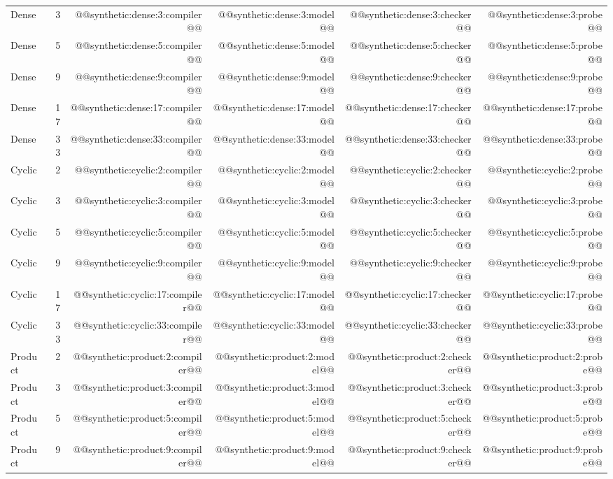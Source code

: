 \begin{longtable}{@{}lrrrrr@{}}
Dense & 3 & @@synthetic:dense:3:compiler@@ & @@synthetic:dense:3:model@@ & @@synthetic:dense:3:checker@@ & @@synthetic:dense:3:probe@@ \\
Dense & 5 & @@synthetic:dense:5:compiler@@ & @@synthetic:dense:5:model@@ & @@synthetic:dense:5:checker@@ & @@synthetic:dense:5:probe@@ \\
Dense & 9 & @@synthetic:dense:9:compiler@@ & @@synthetic:dense:9:model@@ & @@synthetic:dense:9:checker@@ & @@synthetic:dense:9:probe@@ \\
Dense & 17 & @@synthetic:dense:17:compiler@@ & @@synthetic:dense:17:model@@ & @@synthetic:dense:17:checker@@ & @@synthetic:dense:17:probe@@ \\
Dense & 33 & @@synthetic:dense:33:compiler@@ & @@synthetic:dense:33:model@@ & @@synthetic:dense:33:checker@@ & @@synthetic:dense:33:probe@@ \\
Cyclic & 2 & @@synthetic:cyclic:2:compiler@@ & @@synthetic:cyclic:2:model@@ & @@synthetic:cyclic:2:checker@@ & @@synthetic:cyclic:2:probe@@ \\
Cyclic & 3 & @@synthetic:cyclic:3:compiler@@ & @@synthetic:cyclic:3:model@@ & @@synthetic:cyclic:3:checker@@ & @@synthetic:cyclic:3:probe@@ \\
Cyclic & 5 & @@synthetic:cyclic:5:compiler@@ & @@synthetic:cyclic:5:model@@ & @@synthetic:cyclic:5:checker@@ & @@synthetic:cyclic:5:probe@@ \\
Cyclic & 9 & @@synthetic:cyclic:9:compiler@@ & @@synthetic:cyclic:9:model@@ & @@synthetic:cyclic:9:checker@@ & @@synthetic:cyclic:9:probe@@ \\
Cyclic & 17 & @@synthetic:cyclic:17:compiler@@ & @@synthetic:cyclic:17:model@@ & @@synthetic:cyclic:17:checker@@ & @@synthetic:cyclic:17:probe@@ \\
Cyclic & 33 & @@synthetic:cyclic:33:compiler@@ & @@synthetic:cyclic:33:model@@ & @@synthetic:cyclic:33:checker@@ & @@synthetic:cyclic:33:probe@@ \\
Product & 2 & @@synthetic:product:2:compiler@@ & @@synthetic:product:2:model@@ & @@synthetic:product:2:checker@@ & @@synthetic:product:2:probe@@ \\
Product & 3 & @@synthetic:product:3:compiler@@ & @@synthetic:product:3:model@@ & @@synthetic:product:3:checker@@ & @@synthetic:product:3:probe@@ \\
Product & 5 & @@synthetic:product:5:compiler@@ & @@synthetic:product:5:model@@ & @@synthetic:product:5:checker@@ & @@synthetic:product:5:probe@@ \\
Product & 9 & @@synthetic:product:9:compiler@@ & @@synthetic:product:9:model@@ & @@synthetic:product:9:checker@@ & @@synthetic:product:9:probe@@ \\

\end{longtable}
